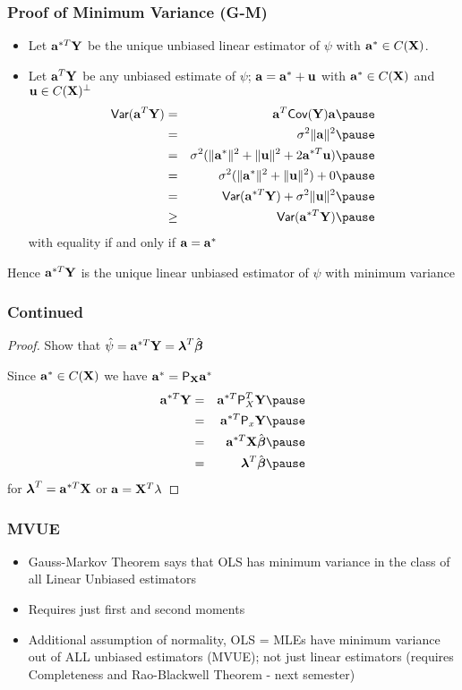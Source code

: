 \documentclass{beamer}
\begin{document}
\begin{frame} \frametitle{Proof of Minimum Variance (G-M)}
 \begin{block}{}
   \begin{itemize}
    \item
    Let $\mathbf{a}^{*T}\mathbf{Y}$ be the unique unbiased linear estimator of $\psi$
    with $\mathbf{a}^* \in C(\mathbf{X})$. \pause
\item Let $\mathbf{a}^T\mathbf{Y}$ be any unbiased estimate of $\psi$; $\mathbf{a} = \mathbf{a}^* +
  \mathbf{u}$ with $\mathbf{a}^* \in C(\mathbf{X})$ and $\mathbf{u} \in C(\mathbf{X})^\perp$ \pause
  \begin{eqnarray*}
    \Var(\a^T\Y) & = & \a^T\Cov(\Y)\a  \pause\\
 & = & \sigma^2 \| \a \|^2  \pause \\
& = & \sigma^2 (\| \a^* \|^2 + \|\u\|^2 + 2 \a^{*T} \u) \pause\\
& = & \sigma^2 (\| \a^* \|^2 + \|\u\|^2) + 0 \pause\\
& = & \Var(\a^{*T}\Y) + \sigma^2 \|\u\|^2 \pause \\
& \geq & \Var(\a^{*T}\Y) \pause
  \end{eqnarray*}
with equality if and only if $\mathbf{a} = \mathbf{a}^*$ \pause
\end{itemize}
Hence $\mathbf{a}^{*T}\mathbf{Y}$ is the unique linear unbiased estimator of $\psi$
with minimum variance 
  \end{block}
\end{frame}
\begin{frame}
  \frametitle{Continued}
  \begin{proof}
  Show that $\hat{\psi} = \mathbf{a}^{*T}\mathbf{Y} = \boldsymbol{\lambda}^T\hat{\boldsymbol{\beta}}$ \pause

  Since $\mathbf{a}^* \in C(\mathbf{X})$ we have $\mathbf{a}^*  =  \textsf{P}_{\mathbf{X}} \mathbf{a}^*$  \pause
    \begin{eqnarray*}
\a^{*T}\Y & = &  \a^{*T} \P_X^T \Y \pause \\
         & = & \a^{*T}\P_x\Y \pause \\
         & = & \a^{*T} \X \bhat \pause \\
         & = & \lambdab^T \bhat  \pause
    \end{eqnarray*}
for $\boldsymbol{\lambda}^T = \mathbf{a}^{*T}\mathbf{X}$  or $\mathbf{a} = \mathbf{X}^T\lambda$
  \end{proof}
\end{frame}
\begin{frame}
  \frametitle{MVUE}
  \begin{itemize}
  \item Gauss-Markov Theorem says that OLS has minimum variance in the
    class of all Linear Unbiased estimators \pause
\item Requires just first and second moments \pause
\item Additional assumption of normality,  OLS = MLEs have
  minimum variance out of \alert<3>{ALL}  unbiased estimators (MVUE); not
  just linear estimators \pause (requires Completeness and
Rao-Blackwell Theorem - next semester) \pause
  \end{itemize}

\end{frame}
\end{document}
